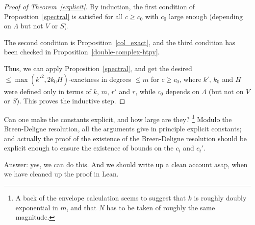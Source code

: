 \begin{proof}[Proof of Theorem~\ref{explicit}]
  \leanok
  By induction, the first condition of Proposition~\ref{spectral}
  is satisfied for all $c\geq c_0$ with $c_0$ large enough
  (depending on $\Lambda$ but not $V$ or $S$).

  The second condition is Proposition~\ref{col_exact},
  and the third condition has been checked in Proposition~\ref{double-complex-htpy}.

  Thus, we can apply Proposition~\ref{spectral},
  and get the desired $\leq \max(k'^2,2k_0H)$-exactness in degrees $\leq m$ for $c\geq c_0$,
  where $k'$, $k_0$ and $H$ were defined only in terms of $k$, $m$, $r'$ and $r$,
  while $c_0$ depends on $\Lambda$ (but not on $V$ or $S$).
  This proves the inductive step.
\end{proof}

\begin{question}
  Can one make the constants explicit, and how large are they?
  \footnote{A back of the envelope calculation seems to suggest that $k$ is roughly doubly exponential in $m$, and that $N$ has to be taken of roughly the same magnitude.}
  Modulo the Breen-Deligne resolution, all the arguments give in principle explicit constants;
  and actually the proof of the existence of the Breen-Deligne resolution
  should be explicit enough to ensure the existence of bounds on the $c_i$ and $c_i'$.

  Answer: yes, we can do this.
  And we should write up a clean account asap,
  when we have cleaned up the proof in Lean.
\end{question}


